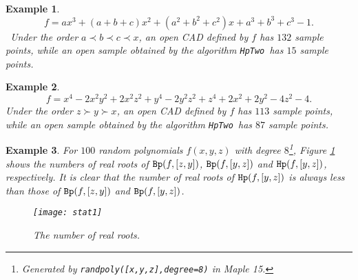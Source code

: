 \documentclass[amsthm]{elsart}
\def \Bproj  {{\tt Bp}}
\def  \Hproj {{\tt Hp}}
\def \TwoHp {{\tt HpTwo}}
\newtheorem{ex}{Example}   \renewcommand{\algorithmicrequire}{\textsf{Input:}}
\begin{document}
\begin{ex} \citep{Strzebonski}
\[f=ax^3+(a+b+c)x^2+(a^2+b^2+c^2)x+a^3+b^3+c^3-1.\]\
Under the order $a\prec b\prec c\prec x$, an open CAD defined by $f$ has $132$ sample points, while an open sample obtained by the algorithm \TwoHp\ has $15$ sample points.
\end{ex}
 \begin{ex}\citep{han2014constructing}
$$f=x^4-2x^2y^2+2x^2z^2+y^4-2y^2z^2+z^4+2x^2+2y^2-4z^2-4.$$ Under the order $z\succ y \succ x$, an open CAD defined by $f$ has $113$ sample points, while an open sample obtained by the algorithm \TwoHp\ has $87$ sample points.
\end{ex}
\begin{ex}
For $100$ random polynomials $f(x,y,z)$ with degree $8$\footnote{Generated by {\tt randpoly([x,y,z],degree=8)} in Maple 15.}, Figure \ref{fig:number} shows the numbers of real roots of $\Bproj(f,[z,y])$, $\Bproj(f,[y,z])$ and $\Hproj(f,[y,z])$, respectively. It is clear that the number of real roots of $\Hproj(f,[y,z])$ is always less than those of $\Bproj(f,[z,y])$ and $\Bproj(f,[y,z])$.
\begin{figure}[ht!]
        \begin{centering}
                \texttt{[image: stat1]}
                \caption{The number of real roots.} \label{fig:number}
        \end{centering}
\end{figure}
\end{ex}
\end{document}

